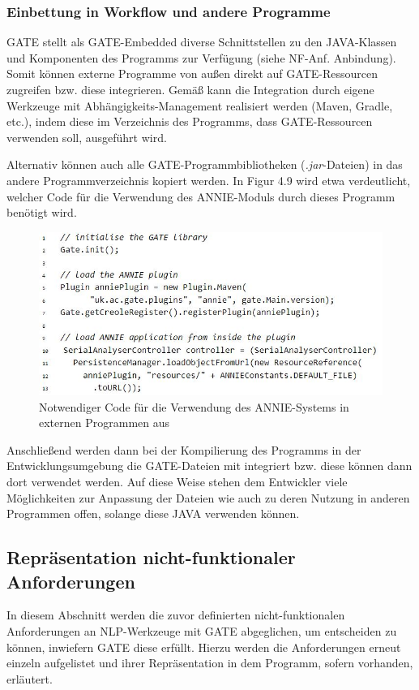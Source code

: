 \documentclass[12pt]{report}
\begin{document}
\subsubsection{Einbettung in Workflow und andere Programme}
GATE stellt als GATE-Embedded diverse Schnittstellen zu den JAVA-Klassen und Komponenten des Programms zur Verfügung (siehe NF-Anf. \glqq  Anbindung\grqq{}). Somit können externe Programme von außen direkt auf GATE-Ressourcen zugreifen bzw. diese integrieren. Gemäß \cite{gt18} kann die Integration durch eigene Werkzeuge mit Abhängigkeits-Management realisiert werden (Maven, Gradle, etc.), indem diese im Verzeichnis des Programms, dass GATE-Ressourcen verwenden soll, ausgeführt wird. 

Alternativ können auch alle GATE-Programmbibliotheken (\textit{.jar}-Dateien) in das andere Programmverzeichnis kopiert werden. In Figur 4.9 wird etwa verdeutlicht, welcher Code für die Verwendung des ANNIE-Moduls durch dieses Programm benötigt wird.
 
\begin{figure}[h!]
\begin{center}
\includegraphics[scale=0.8]{GATE_Bilder/Einbettung.jpg}
\caption{Notwendiger Code für die Verwendung des ANNIE-Systems in externen Programmen aus \cite{gt18}}
\end{center}
\end{figure}

Anschließend werden dann bei der Kompilierung des Programms in der Entwicklungsumgebung die GATE-Dateien mit integriert bzw. diese können dann dort verwendet werden. Auf diese Weise stehen dem Entwickler viele Möglichkeiten zur Anpassung der Dateien wie auch zu deren Nutzung in anderen Programmen offen, solange diese JAVA verwenden können.

\subsection{Repräsentation nicht-funktionaler Anforderungen}
In diesem Abschnitt werden die zuvor definierten nicht-funktionalen Anforderungen an NLP-Werkzeuge mit GATE abgeglichen, um entscheiden zu können, inwiefern GATE diese erfüllt. Hierzu werden die Anforderungen erneut einzeln aufgelistet und ihrer Repräsentation in dem Programm, sofern vorhanden, erläutert. 
\end{document}

